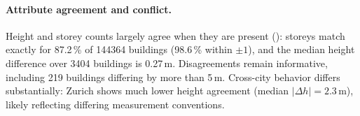 \documentclass[sigconf,authordraft]{acmart}
\begin{document}
\paragraph{Attribute agreement and conflict.} Height and storey counts largely agree when they are present (): storeys match exactly for 87.2\,\% of \num{144364} buildings (98.6\,\% within $\pm1$), and the median height difference over \num{3404} buildings is 0.27\,m. Disagreements remain informative, including 219 buildings differing by more than 5\,m. Cross-city behavior differs substantially: Zurich shows much lower height agreement (median $|\Delta h|=2.3$\,m), likely reflecting differing measurement conventions. 
\end{document}
